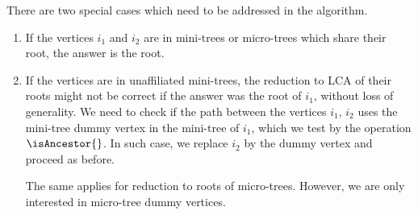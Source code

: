 There are two special cases which need to be addressed in the algorithm.
\begin{enumerate}
	\item If the vertices $i_1$ and $i_2$ are in mini-trees or micro-trees which share their root, the answer is the root.
	
	\item If the vertices are in unaffiliated mini-trees, the reduction to LCA of their roots might not be correct if the answer was the root of $i_1$, without loss of generality.
	We need to check if the path between the vertices $i_1$, $i_2$ uses the mini-tree dummy vertex in the mini-tree of $i_1$, which we test by the operation $\isAncestor{}$.
	In such case, we replace $i_2$ by the dummy vertex and proceed as before.
	
	The same applies for reduction to roots of micro-trees.
	However, we are only interested in micro-tree dummy vertices.
\end{enumerate}

\begin{algorithm}
\begin{algorithmic}
	 
		 
			\State {}
		 
			\State {} 
		\Else {}
				 
					\State {} 
				\EndIf
			\EndIf
			  
					\State {}
				\EndIf
			\EndIf
			\State {}
		\EndIf
	 
		\State {} 
	\Else {}
			 
				\State {} 
			\EndIf
		\EndIf
		 
				\State {}
			\EndIf
		\EndIf
		\State {}
	\EndIf
\EndFunction
\end{algorithmic}
\end{algorithm}

